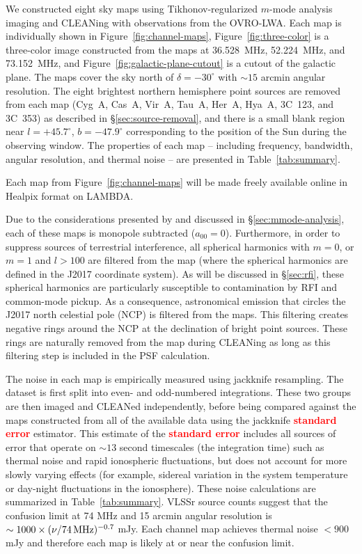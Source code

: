\documentclass[twocolumn]{aastex61}
\newcommand{\revision}[1]{\textcolor{red}{\textbf{#1}}}
\begin{document}
We constructed eight sky maps using Tikhonov-regularized $m$-mode analysis imaging and CLEANing with
observations from the OVRO-LWA. Each map is individually shown in Figure~\ref{fig:channel-maps},
Figure~\ref{fig:three-color} is a three-color image constructed from the maps at 36.528~MHz,
52.224~MHz, and 73.152~MHz, and Figure~\ref{fig:galactic-plane-cutout} is a cutout of the galactic
plane. The maps cover the sky north of $\delta=-30^\circ$ with $\sim 15$ arcmin angular resolution.
The eight brightest northern hemisphere point sources are removed from each map (Cyg~A, Cas~A,
Vir~A, Tau~A, Her~A, Hya~A, 3C~123, and 3C~353) as described in \S\ref{sec:source-removal}, and
there is a small blank region near $l=+45.7^\circ$, $b=-47.9^\circ$ corresponding to the position of
the Sun during the observing window. The properties of each map -- including frequency, bandwidth,
angular resolution, and thermal noise -- are presented in Table~\ref{tab:summary}.

Each map from Figure~\ref{fig:channel-maps} will be made freely available online in Healpix format
\citep{2005ApJ...622..759G} on LAMBDA.

Due to the considerations presented by \citet{2016ApJ...826..116V} and discussed in
\S\ref{sec:mmode-analysis}, each of these maps is monopole subtracted ($a_{00}=0$).  Furthermore, in
order to suppress sources of terrestrial interference, all spherical harmonics with $m=0$, or $m=1$
and $l>100$ are filtered from the map (where the spherical harmonics are defined in the J2017
coordinate system). As will be discussed in \S\ref{sec:rfi}, these spherical harmonics are
particularly susceptible to contamination by RFI and common-mode pickup. As a consequence,
astronomical emission that circles the J2017 north celestial pole (NCP) is filtered from the maps.
This filtering creates negative rings around the NCP at the declination of bright point sources.
These rings are naturally removed from the map during CLEANing as long as this filtering step is
included in the PSF calculation.

The noise in each map is empirically measured using jackknife resampling. The dataset is first split
into even- and odd-numbered integrations. These two groups are then imaged and CLEANed
independently, before being compared against the maps constructed from all of the available data
using the jackknife \revision{standard error} estimator. This estimate of the \revision{standard
error} includes all sources of error that operate on $\sim13$ second timescales (the integration
time) such as thermal noise and rapid ionospheric fluctuations, but does not account for more slowly
varying effects (for example, sidereal variation in the system temperature or day-night fluctuations
in the ionosphere).  These noise calculations are summarized in Table~\ref{tab:summary}.  VLSSr
source counts \citep{2014MNRAS.440..327L} suggest that the confusion limit at 74 MHz and 15 arcmin
angular resolution is $\sim 1000\times(\nu/74\,{\rm MHz})^{-0.7}$ mJy.  Each channel map achieves
thermal noise $<900$ mJy and therefore each map is likely at or near the confusion limit.
\end{document}
